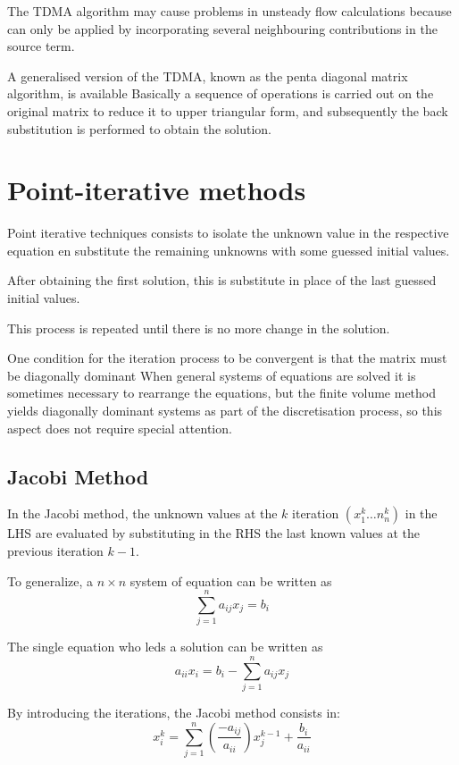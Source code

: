\documentclass[a4paper, 15pt]{article}
\begin{document}
The TDMA algorithm may cause problems in unsteady flow calculations because can only be applied by incorporating several neighbouring contributions in the
source term. \newline 

A
generalised version of the TDMA, known as the penta diagonal matrix algorithm, is available
Basically
a sequence of operations is carried out on the original matrix to reduce it to upper
triangular form, and subsequently the back substitution is performed to obtain the solution. 

\section{Point-iterative methods}

Point
iterative techniques consists to isolate the unknown value in the respective equation en substitute the remaining unknowns with some guessed initial values.

After obtaining the first solution, this is substitute in place of the last guessed initial values. 

This
process is repeated until there is no more change in the solution. \newline 

One
condition for the iteration process to be convergent is that the matrix must be diagonally
dominant
When
general systems of equations are solved it is sometimes necessary to rearrange the
equations, but the finite volume method yields diagonally dominant systems as part of the
discretisation process, so this aspect does not require special attention. 

\subsection{Jacobi Method}
In
the Jacobi method, the unknown values at the $k$ iteration $(x_1^k\dots n_n^k)$ in the LHS are evaluated by substituting in the RHS the last known values at the previous iteration $k-1$. \newline 

To generalize, a $n\times n$ system of equation can be written as
\[\sum_{j=1}^{n}a_{ij}x_j = b_i\]

The single equation who leds a solution can be written as 
\[a_{ii}x_i = b_i - \sum_{j=1}^{n}a_{ij}{x_j}\]

By introducing the iterations, the Jacobi method consists in:
\[x_i^k = \sum_{j=1}^{n}\left(\dfrac{-a_{ij}}{a_{ii}}\right){x_j^{k-1}} + \dfrac{b_i}{a_{ii}}\]
\end{document}
